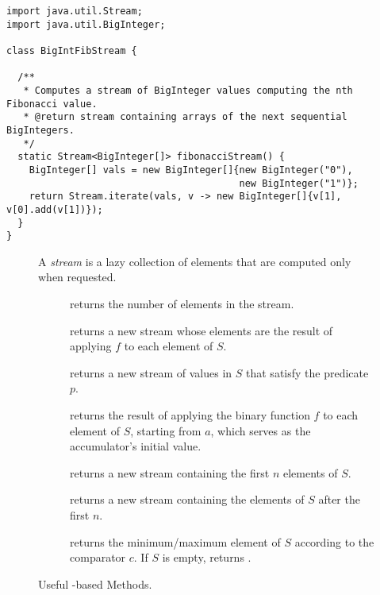 \begin{cl}[]{}
\begin{lstlisting}[language=MyJava]
import java.util.Stream;
import java.util.BigInteger;

class BigIntFibStream {

  /**
   * Computes a stream of BigInteger values computing the nth Fibonacci value.
   * @return stream containing arrays of the next sequential BigIntegers.
   */
  static Stream<BigInteger[]> fibonacciStream() {
    BigInteger[] vals = new BigInteger[]{new BigInteger("0"), 
                                         new BigInteger("1")};
    return Stream.iterate(vals, v -> new BigInteger[]{v[1], v[0].add(v[1])});
  }
}
\end{lstlisting}
\end{cl}

\begin{figure}[tp]
  \small
  \begin{tcolorbox}[title=Java Streams]
    A \textit{stream} is a lazy collection of elements that are computed only when requested.
    \vspace{2ex}
  \begin{description}
    \item [] returns the number of elements in the stream.
    \item [] returns a new stream whose elements are the result of applying $f$ to each element of $S$.
    \item [] returns a new stream of values in $S$ that satisfy the predicate $p$.
    \item [] returns the result of applying the binary function $f$ to each element of $S$, starting from $a$, which serves as the accumulator's initial value.
    \item [] returns a new stream containing the first $n$ elements of $S$.
    \item [] returns a new stream containing the elements of $S$ after the first $n$.
    \item [] returns the minimum/maximum element of $S$ according to the comparator $c$. If $S$ is empty, returns .
  \end{description}
\end{tcolorbox}
  \caption{Useful -based Methods.}
  \label{fig:streams}
\end{figure}

